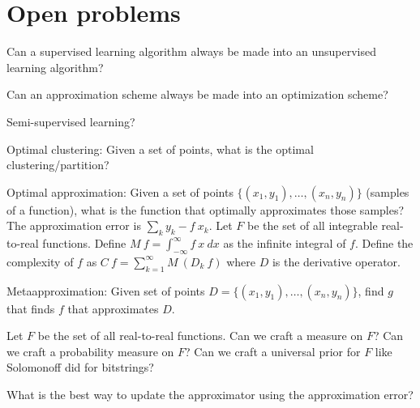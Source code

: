 \chapter{Open problems}

Can a supervised learning algorithm always be made into an unsupervised learning algorithm?

Can an approximation scheme always be made into an optimization scheme?

Semi-supervised learning?

Optimal clustering:
Given a set of points, what is the optimal clustering/partition?

Optimal approximation:
Given a set of points
\(\{(x_1,y_1),\ldots,(x_n,y_n)\}\)
(samples of a function),
what is the function that optimally approximates those samples?
The approximation error is \(\sum_k y_k - f~x_k \).
Let \(F\) be the set of all integrable real-to-real functions.
Define \(M~f = \int_{-\infty}^\infty f~x~dx\) as the infinite integral of \(f\).
Define the complexity of \(f\)
as \(C~f = \sum_{k=1}^\infty M~(D_k~f)\)
where \(D\) is the derivative operator.

Metaapproximation:
Given set of points
\(D = \{(x_1,y_1),\ldots,(x_n,y_n)\}\),
find \(g\) that finds \(f\) that approximates \(D\).

Let \(F\) be the set of all real-to-real functions.
Can we craft a measure on \(F\)?
Can we craft a probability measure on \(F\)?
Can we craft a universal prior for \(F\) like Solomonoff did for bitstrings?

What is the best way to update the approximator using the approximation error?
